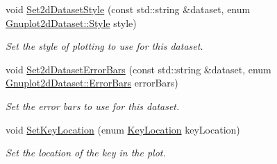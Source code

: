 \begin{DoxyCompactItemize}
void \hyperlink{classns3_1_1GnuplotAggregator_a6fec17325d4712cff282135aed5aadda}{Set2d\+Dataset\+Style} (const std\+::string \&dataset, enum \hyperlink{classns3_1_1Gnuplot2dDataset_abdad90b4b2abed9a198e4b19470de882}{Gnuplot2d\+Dataset\+::\+Style} style)
\begin{DoxyCompactList}\small\item\em Set the style of plotting to use for this dataset. \end{DoxyCompactList}\item 
void \hyperlink{classns3_1_1GnuplotAggregator_a7705154c660086701e9c17361f06157d}{Set2d\+Dataset\+Error\+Bars} (const std\+::string \&dataset, enum \hyperlink{classns3_1_1Gnuplot2dDataset_a5984738d258811bed5eff163d4e3d648}{Gnuplot2d\+Dataset\+::\+Error\+Bars} error\+Bars)
\begin{DoxyCompactList}\small\item\em Set the error bars to use for this dataset. \end{DoxyCompactList}\item 
void \hyperlink{classns3_1_1GnuplotAggregator_a8feb7d7b1dc764b5c542a08db33e1ba8}{Set\+Key\+Location} (enum \hyperlink{classns3_1_1GnuplotAggregator_a84f2dafa52bb704042bc13c6cd6ee216}{Key\+Location} key\+Location)
\begin{DoxyCompactList}\small\item\em Set the location of the key in the plot. \end{DoxyCompactList}\end{DoxyCompactItemize}
